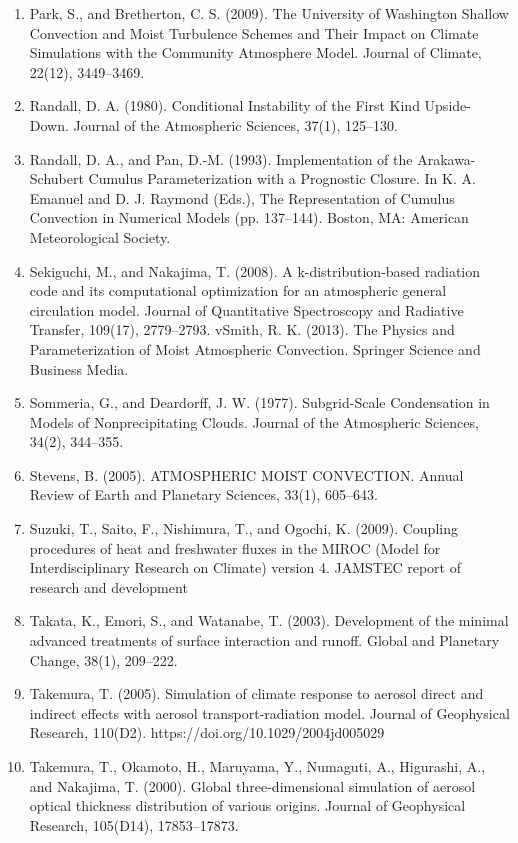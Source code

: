 \begin{enumerate}
\item Park, S., and Bretherton, C. S. (2009). The University of Washington Shallow Convection and Moist Turbulence Schemes and Their Impact on Climate Simulations with the Community Atmosphere Model. Journal of Climate, 22(12), 3449–3469.
\item Randall, D. A. (1980). Conditional Instability of the First Kind Upside-Down. Journal of the Atmospheric Sciences, 37(1), 125–130.
\item Randall, D. A., and Pan, D.-M. (1993). Implementation of the Arakawa-Schubert Cumulus Parameterization with a Prognostic Closure. In K. A. Emanuel and D. J. Raymond (Eds.), The Representation of Cumulus Convection in Numerical Models (pp. 137–144). Boston, MA: American Meteorological Society.
\item Sekiguchi, M., and Nakajima, T. (2008). A k-distribution-based radiation code and its computational optimization for an atmospheric general circulation model. Journal of Quantitative Spectroscopy and Radiative Transfer, 109(17), 2779–2793.
vSmith, R. K. (2013). The Physics and Parameterization of Moist Atmospheric Convection. Springer Science and Business Media.
\item Sommeria, G., and Deardorff, J. W. (1977). Subgrid-Scale Condensation in Models of Nonprecipitating Clouds. Journal of the Atmospheric Sciences, 34(2), 344–355.
\item Stevens, B. (2005). ATMOSPHERIC MOIST CONVECTION. Annual Review of Earth and Planetary Sciences, 33(1), 605–643.
\item Suzuki, T., Saito, F., Nishimura, T., and Ogochi, K. (2009). Coupling procedures of heat and freshwater fluxes in the MIROC (Model for Interdisciplinary Research on Climate) version 4. JAMSTEC report of research and development
\item Takata, K., Emori, S., and Watanabe, T. (2003). Development of the minimal advanced treatments of surface interaction and runoff. Global and Planetary Change, 38(1), 209–222.
\item Takemura, T. (2005). Simulation of climate response to aerosol direct and indirect effects with aerosol transport-radiation model. Journal of Geophysical Research, 110(D2). https://doi.org/10.1029/2004jd005029
\item Takemura, T., Okamoto, H., Maruyama, Y., Numaguti, A., Higurashi, A., and Nakajima, T. (2000). Global three-dimensional simulation of aerosol optical thickness distribution of various origins. Journal of Geophysical Research, 105(D14), 17853–17873.

\end{enumerate}
